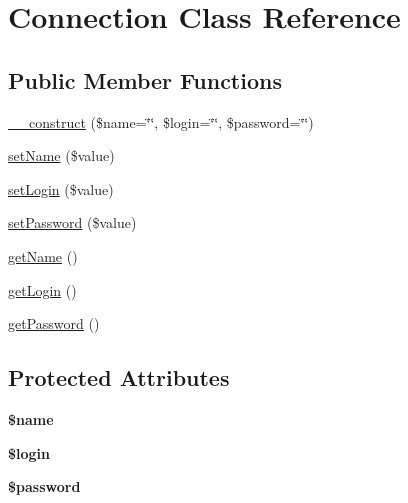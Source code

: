 \hypertarget{classConnection}{\section{Connection Class Reference}
\label{classConnection}
}
\subsection*{Public Member Functions}
\begin{DoxyCompactItemize}
\item 
\hyperlink{classConnection_af771235bb906d236fdb9c377dd72b2d3}{\-\_\-\-\_\-construct} (\$name=\char`\"{}\char`\"{}, \$login=\char`\"{}\char`\"{}, \$password=\char`\"{}\char`\"{})
\item 
\hyperlink{classConnection_a07862558a8273ecdcb8565de4224e9d3}{set\-Name} (\$value)
\item 
\hyperlink{classConnection_a79aef948a679e22febbfcc20ab0f06cf}{set\-Login} (\$value)
\item 
\hyperlink{classConnection_a61e34cf3b6aa60c68a2f2d1a968b26e1}{set\-Password} (\$value)
\item 
\hyperlink{classConnection_a882ddaba52867a37ae4dd161a0f1126b}{get\-Name} ()
\item 
\hyperlink{classConnection_ac5ae5f832eed0233cac4e0bd822f7b5c}{get\-Login} ()
\item 
\hyperlink{classConnection_a8a2f53b314d9b93918cf83cca26c6c98}{get\-Password} ()
\end{DoxyCompactItemize}
\subsection*{Protected Attributes}
\begin{DoxyCompactItemize}
\item 
\hypertarget{classConnection_a2470d09977dda8740d324166705b98ce}{{\bfseries \$name}}\label{classConnection_a2470d09977dda8740d324166705b98ce}

\item 
\hypertarget{classConnection_ac3b5d2f7136ca52ab029e7d290b5712c}{{\bfseries \$login}}\label{classConnection_ac3b5d2f7136ca52ab029e7d290b5712c}

\item 
\hypertarget{classConnection_aab08fd521c7b1c631671094dd25b658d}{{\bfseries \$password}}\label{classConnection_aab08fd521c7b1c631671094dd25b658d}

\end{DoxyCompactItemize}



